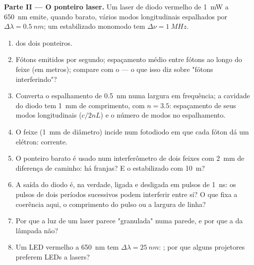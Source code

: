 \begin{problem}
\medskip
\noindent\textbf{Parte II --- O ponteiro laser.}
Um laser de diodo vermelho de \qty{1}{mW} a \qty{650}{nm} emite, quando barato, vários
modos longitudinais espalhados por $\Delta\lambda = \qty{0.5}{nm}$; um estabilizado
monomodo tem $\Delta\nu = \qty{1}{MHz}$.
\begin{enumerate}[resume]
  \item {} dos dois ponteiros.
  \item Fótons emitidos por segundo; espaçamento médio entre fótons ao longo
        do feixe (em metros); compare com o  ---
        o que isso diz sobre "fótons interferindo"?
  \item Converta o espalhamento de \qty{0.5}{nm} numa largura em frequência; a
        cavidade do diodo tem \qty{1}{mm} de comprimento, com $n = 3.5$: espaçamento de seus
        modos longitudinais ($c/2nL$) e o número de modos no
        espalhamento.
  \item O feixe (\qty{1}{mm} de diâmetro) incide num fotodiodo em que
        cada fóton dá um elétron: corrente.
  \item O ponteiro barato é usado num interferômetro de dois feixes com
        \qty{2}{mm} de diferença de caminho: há franjas? E o estabilizado
        com \qty{10}{m}?
  \item A saída do diodo é, na verdade, ligada e desligada em
        pulsos de \qty{1}{ns}: os pulsos de dois períodos sucessivos podem
        interferir entre si? O que fixa a coerência aqui, o comprimento do
        pulso ou a largura de linha?
  \item Por que a luz de um laser parece "granulada" numa parede, e por que
        a da lâmpada não?
  \item Um LED vermelho a \qty{650}{nm} tem $\Delta\lambda = \qty{25}{nm}$: ; por que alguns projetores preferem LEDs a lasers?
\end{enumerate}


\end{problem}
